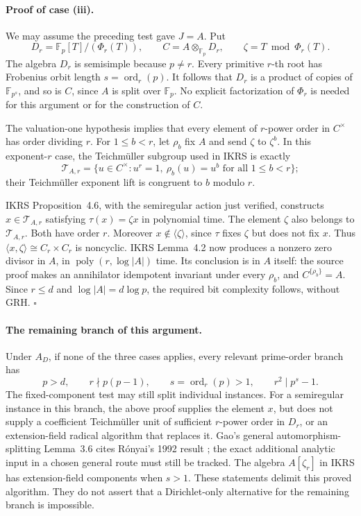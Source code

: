 \documentclass[11pt,a4paper]{article}
\begin{document}
\paragraph{Proof of case (iii).}
We may assume the preceding test gave \(J=A\).
Put
\[
 D_r=\mathbb F_p[T]/(\Phi_r(T)),\qquad
 C=A\otimes_{\mathbb F_p}D_r,\qquad
 \zeta=T\bmod\Phi_r(T).
\]
The algebra \(D_r\) is semisimple because \(p\ne r\).
Every primitive \(r\)-th root has Frobenius orbit length
\(s=\operatorname{ord}_r(p)\).
It follows that \(D_r\) is a product of copies of
\(\mathbb F_{p^s}\), and so is \(C\), since \(A\) is split over
\(\mathbb F_p\).
No explicit factorization of \(\Phi_r\) is needed for this argument
or for the construction of \(C\).

The valuation-one hypothesis implies that every element of
\(r\)-power order in \(C^\times\) has order dividing \(r\).
For \(1\leq b<r\), let \(\rho_b\) fix \(A\) and send
\(\zeta\) to \(\zeta^b\).
In this exponent-\(r\) case, the Teichm\"uller subgroup used in IKRS
is exactly
\[
 \mathcal T_{A,r}
 =\{u\in C^\times:u^r=1,\ 
          \rho_b(u)=u^b\text{ for all }1\leq b<r\};
\]
their Teichm\"uller exponent lift is congruent to \(b\) modulo \(r\).

IKRS Proposition~4.6, with the semiregular action just verified,
constructs \(x\in\mathcal T_{A,r}\) satisfying
\(\tau(x)=\zeta x\) in polynomial time.
The element \(\zeta\) also belongs to \(\mathcal T_{A,r}\).
Both have order \(r\).
Moreover \(x\notin\langle\zeta\rangle\), since \(\tau\) fixes
\(\zeta\) but does not fix \(x\).
Thus \(\langle x,\zeta\rangle\cong C_r\times C_r\) is noncyclic.
IKRS Lemma~4.2 now produces a nonzero zero divisor in
\(A\), in \(\operatorname{poly}(r,\log|A|)\) time.
Its conclusion is in \(A\) itself: the source proof makes an
annihilator idempotent invariant under every \(\rho_b\), and
\(C^{\{\rho_b\}}=A\).
Since \(r\leq d\) and \(\log|A|=d\log p\), the required bit
complexity follows, without GRH.
\hfill\(\square\)

\paragraph{The remaining branch of this argument.}
Under \(A_D\), if none of the three cases applies, every relevant
prime-order branch has
\[
 p>d,\qquad
 r\nmid p(p-1),\qquad
 s=\operatorname{ord}_r(p)>1,\qquad
 r^2\mid p^s-1.
\]
The fixed-component test may still split individual instances.
For a semiregular instance in this branch, the above proof supplies
the element \(x\), but does not supply a coefficient
Teichm\"uller unit of sufficient \(r\)-power order in \(D_r\),
or an extension-field radical algorithm that replaces it.
Gao's general automorphism-splitting Lemma~3.6 cites
R\'onyai's 1992 result
\cite[Lemma~3.6, author p.16]{CXNGao01};
the exact additional analytic input in a chosen general route
must still be tracked.
The algebra \(A[\zeta_r]\) in IKRS has extension-field components
when \(s>1\).
These statements delimit this proved algorithm.
They do not assert that a Dirichlet-only alternative for the
remaining branch is impossible.
\end{document}

